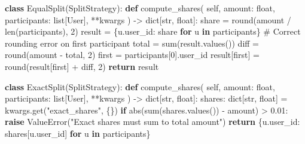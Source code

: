 \documentclass[11pt]{article}
\newenvironment{Shaded}{\begin{snugshade}}{\end{snugshade}}
\newcommand{\BuiltInTok}[1]{\textcolor[rgb]{0.50,0.55,0.55}{#1}}
\newcommand{\CommentTok}[1]{\textcolor[rgb]{0.48,0.49,0.49}{#1}}
\newcommand{\ControlFlowTok}[1]{\textcolor[rgb]{0.99,0.74,0.29}{\textbf{#1}}}
\newcommand{\DecValTok}[1]{\textcolor[rgb]{0.96,0.45,0.00}{#1}}
\newcommand{\FloatTok}[1]{\textcolor[rgb]{0.96,0.45,0.00}{#1}}
\newcommand{\KeywordTok}[1]{\textcolor[rgb]{0.81,0.81,0.76}{\textbf{#1}}}
\newcommand{\NormalTok}[1]{\textcolor[rgb]{0.81,0.81,0.76}{#1}}
\newcommand{\OperatorTok}[1]{\textcolor[rgb]{0.81,0.81,0.76}{#1}}
\newcommand{\PreprocessorTok}[1]{\textcolor[rgb]{0.15,0.68,0.38}{#1}}
\newcommand{\StringTok}[1]{\textcolor[rgb]{0.96,0.31,0.31}{#1}}
\newcommand{\VariableTok}[1]{\textcolor[rgb]{0.15,0.68,0.68}{#1}}
\begin{document}
\begin{Shaded}
\begin{Highlighting}[]
\KeywordTok{class}\NormalTok{ EqualSplit(SplitStrategy):}
    \KeywordTok{def}\NormalTok{ compute\_shares(}
        \VariableTok{self}\NormalTok{, amount: }\BuiltInTok{float}\NormalTok{, participants: }\BuiltInTok{list}\NormalTok{[User], }\OperatorTok{**}\NormalTok{kwargs}
\NormalTok{    ) }\OperatorTok{{-}\textgreater{}} \BuiltInTok{dict}\NormalTok{[}\BuiltInTok{str}\NormalTok{, }\BuiltInTok{float}\NormalTok{]:}
\NormalTok{        share }\OperatorTok{=} \BuiltInTok{round}\NormalTok{(amount }\OperatorTok{/} \BuiltInTok{len}\NormalTok{(participants), }\DecValTok{2}\NormalTok{)}
\NormalTok{        result }\OperatorTok{=}\NormalTok{ \{u.user\_id: share }\ControlFlowTok{for}\NormalTok{ u }\KeywordTok{in}\NormalTok{ participants\}}
        \CommentTok{\# Correct rounding error on first participant}
\NormalTok{        total }\OperatorTok{=} \BuiltInTok{sum}\NormalTok{(result.values())}
\NormalTok{        diff }\OperatorTok{=} \BuiltInTok{round}\NormalTok{(amount }\OperatorTok{{-}}\NormalTok{ total, }\DecValTok{2}\NormalTok{)}
\NormalTok{        first }\OperatorTok{=}\NormalTok{ participants[}\DecValTok{0}\NormalTok{].user\_id}
\NormalTok{        result[first] }\OperatorTok{=} \BuiltInTok{round}\NormalTok{(result[first] }\OperatorTok{+}\NormalTok{ diff, }\DecValTok{2}\NormalTok{)}
        \ControlFlowTok{return}\NormalTok{ result}


\KeywordTok{class}\NormalTok{ ExactSplit(SplitStrategy):}
    \KeywordTok{def}\NormalTok{ compute\_shares(}
        \VariableTok{self}\NormalTok{, amount: }\BuiltInTok{float}\NormalTok{, participants: }\BuiltInTok{list}\NormalTok{[User], }\OperatorTok{**}\NormalTok{kwargs}
\NormalTok{    ) }\OperatorTok{{-}\textgreater{}} \BuiltInTok{dict}\NormalTok{[}\BuiltInTok{str}\NormalTok{, }\BuiltInTok{float}\NormalTok{]:}
\NormalTok{        shares: }\BuiltInTok{dict}\NormalTok{[}\BuiltInTok{str}\NormalTok{, }\BuiltInTok{float}\NormalTok{] }\OperatorTok{=}\NormalTok{ kwargs.get(}\StringTok{"exact\_shares"}\NormalTok{, \{\})}
        \ControlFlowTok{if} \BuiltInTok{abs}\NormalTok{(}\BuiltInTok{sum}\NormalTok{(shares.values()) }\OperatorTok{{-}}\NormalTok{ amount) }\OperatorTok{\textgreater{}} \FloatTok{0.01}\NormalTok{:}
            \ControlFlowTok{raise} \PreprocessorTok{ValueError}\NormalTok{(}\StringTok{"Exact shares must sum to total amount"}\NormalTok{)}
        \ControlFlowTok{return}\NormalTok{ \{u.user\_id: shares[u.user\_id] }\ControlFlowTok{for}\NormalTok{ u }\KeywordTok{in}\NormalTok{ participants\}}



\end{Highlighting}
\end{Shaded}
\end{document}
